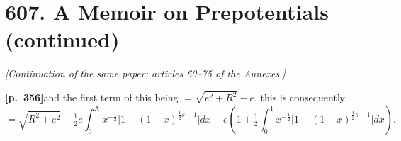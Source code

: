 \documentclass[11pt]{article}
\begin{document}
\section*{\textbf{607.} A Memoir on Prepotentials (continued)}

\textit{[Continuation of the same paper; articles 60--75 of the Annexes.]}

\bigskip

\noindent\textbf{[p.~356]}\quad and the first term of this being $=\sqrt{e^{2}+R^{2}}-e$, this is consequently
\[
= \sqrt{R^{2}+e^{2}} + \tfrac{1}{2}e\int_{0}^{X} x^{-\frac{1}{2}}\bigl[1-(1-x)^{\frac{1}{2}s-1}\bigr]dx
- e\left(1+\tfrac{1}{2}\int_{0}^{1} x^{-\frac{1}{2}}\bigl[1-(1-x)^{\frac{1}{2}s-1}\bigr]dx\right).
\]
\end{document}
